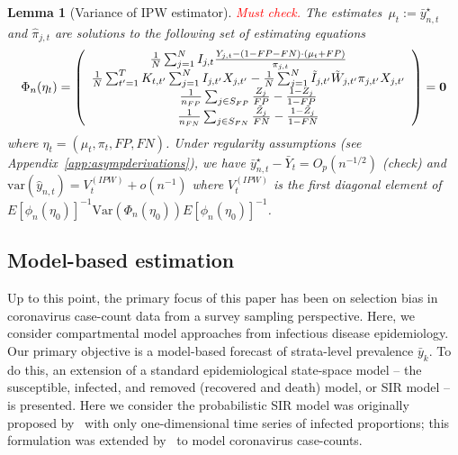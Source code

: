 \documentclass[12pt]{amsart}
\numberwithin{equation}{section}
\theoremstyle{plain}
\newtheorem{lemma}[theorem]{Lemma}
\begin{document}
\begin{lemma}[Variance of IPW estimator] \normalfont
\label{lemma:ipw}
\textcolor{red}{Must check.}
The estimates~$\mu_t := \bar y_{n,t}^\star$ and $\hat \pi_{j,t}$
are solutions to the following set of estimating equations
$$
\Phi_n (\eta_t) =
\left (
\begin{array}{c}
\frac{1}{N} \sum_{j=1}^N I_{j,t} \frac{Y_{j,t} - (1-FP-FN) \cdot (\mu_t+FP)}{\pi_{j,t}} \\
\frac{1}{N} \sum_{t^\prime = 1}^T K_{t,t^\prime} \sum_{j=1}^N I_{j,t^\prime} X_{j,t^\prime} - \frac{1}{N} \sum_{j = 1}^N \tilde I_{j,t^\prime} \tilde W_{j,t^\prime}  \pi_{j,t^\prime} X_{j,t^\prime}  \\
\frac{1}{n_{FP}} \sum_{j \in S_{FP}} \frac{Z_j}{FP} - \frac{1-Z_j}{1-FP} \\
\frac{1}{n_{FN}} \sum_{j \in S_{FN}} \frac{\tilde Z_j}{FN} - \frac{1-\tilde Z_j}{1-FN} \\
\end{array}
\right ) = {\bf 0}
$$
where $\eta_t = (\mu_t, \pi_t, FP, FN)$. Under regularity assumptions (see Appendix~\ref{app:asympderivations}), we have $\bar y_{n,t}^\star - \bar Y_{t} = O_p (n^{-1/2})$ (check)  and $\text{var} (\hat y_{n,t}) = V_{t}^{(IPW)} + o (n^{-1})$ where $V_t^{(IPW)}$ is the first diagonal element of $E [\phi_n(\eta_0)]^{-1} \text{Var}(\Phi_n(\eta_0))E [\phi_n(\eta_0)]^{-1}$.
\end{lemma}

\subsection{Model-based estimation}
\label{section:modelbased}

Up to this point, the primary focus of this paper has been on selection bias in coronavirus case-count data from a survey sampling perspective.  Here, we consider compartmental model approaches from infectious disease epidemiology.  Our primary objective is a model-based forecast of strata-level prevalence $\bar y_k$. To do this, an extension of a standard epidemiological state-space model -- the susceptible, infected, and removed (recovered and death) model, or SIR model -- is presented. Here we consider the probabilistic SIR model was originally proposed by~\cite{Osthus2017} with only one-dimensional time series of infected proportions; this formulation was extended by~\cite{Song2020} to model coronavirus case-counts.
\end{document}
